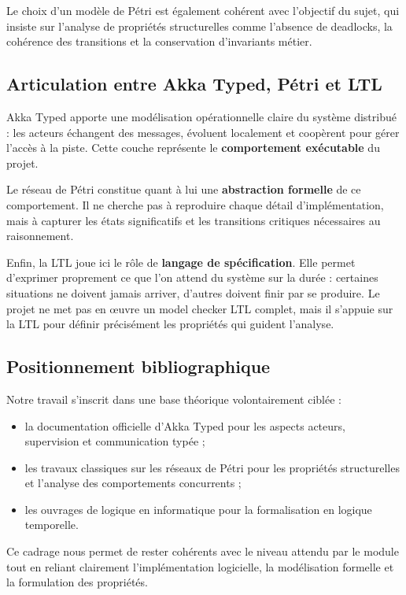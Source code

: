 \documentclass[11pt,a4paper]{article}
\begin{document}
Le choix d'un modèle de Pétri est également cohérent avec l'objectif du sujet, qui insiste sur l'analyse de propriétés structurelles comme l'absence de deadlocks, la cohérence des transitions et la conservation d'invariants métier.

\subsection{Articulation entre Akka Typed, Pétri et LTL}

Akka Typed apporte une modélisation opérationnelle claire du système distribué : les acteurs échangent des messages, évoluent localement et coopèrent pour gérer l'accès à la piste. Cette couche représente le \textbf{comportement exécutable} du projet.

Le réseau de Pétri constitue quant à lui une \textbf{abstraction formelle} de ce comportement. Il ne cherche pas à reproduire chaque détail d'implémentation, mais à capturer les états significatifs et les transitions critiques nécessaires au raisonnement.

Enfin, la LTL joue ici le rôle de \textbf{langage de spécification}. Elle permet d'exprimer proprement ce que l'on attend du système sur la durée : certaines situations ne doivent jamais arriver, d'autres doivent finir par se produire. Le projet ne met pas en œuvre un model checker LTL complet, mais il s'appuie sur la LTL pour définir précisément les propriétés qui guident l'analyse.

\subsection{Positionnement bibliographique}

Notre travail s'inscrit dans une base théorique volontairement ciblée :
\begin{itemize}
    \item la documentation officielle d'Akka Typed pour les aspects acteurs, supervision et communication typée ;
    \item les travaux classiques sur les réseaux de Pétri pour les propriétés structurelles et l'analyse des comportements concurrents ;
    \item les ouvrages de logique en informatique pour la formalisation en logique temporelle.
\end{itemize}

Ce cadrage nous permet de rester cohérents avec le niveau attendu par le module tout en reliant clairement l'implémentation logicielle, la modélisation formelle et la formulation des propriétés.
\end{document}

